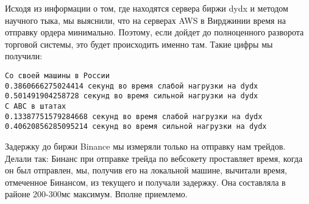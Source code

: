 Исходя из информации о том, где находятся сервера биржи dydx и методом научного тыка, мы выяснили, что на серверах AWS в Вирджинии время на отправку ордера минимально. Поэтому, если дойдет до полноценного разворота торговой системы, это будет происходить именно там. Такие цифры мы получили: 
\begin{verbatim}
Со своей машины в России
0.3860666275024414 секунд во время слабой нагрузки на dydx
0.501491904258728 секунд во время сильной нагрузки на dydx
С АВС в штатах
0.13387751579284668 секунд во время слабой нагрузки на dydx
0.40620856285095214 секунд во время сильной нагрузки на dydx
\end{verbatim}

Задержку до биржи Binance мы измеряли только на отправку нам трейдов. Делали так: Бинанс при отправке трейда по вебсокету проставляет время, когда он был отправлен, мы, получив его на локальной машине, вычитали время, отмеченное Бинансом, из текущего и получали задержку. Она составляла в районе 200-300мс максимум. Вполне приемлемо.